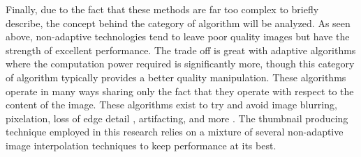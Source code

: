 Finally, due to the fact that these methods are far too complex to briefly describe, the concept behind the category of algorithm will be analyzed. As seen above, non-adaptive technologies tend to leave poor quality images but have the strength of excellent performance. The trade off is great with adaptive algorithms where the computation power required is significantly more, though this category of algorithm typically provides a better quality manipulation. These algorithms operate in many ways sharing only the fact that they operate with respect to the content of the image. \cite{Wu:2007:NII:1777454.1777548} These algorithms exist to try and avoid image blurring, pixelation, loss of edge detail \cite{Centeno:2012:CAA:2245276.2245290}, artifacting, and more \cite{Acharya:2007}. The thumbnail producing technique employed in this research relies on a mixture of several non-adaptive image interpolation techniques to keep performance at its best.